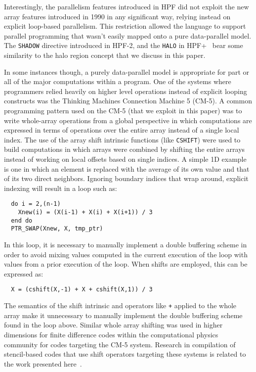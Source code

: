 Interestingly, the parallelism features introduced in HPF did not
exploit the new array features introduced in 1990 in any significant
way, relying instead on explicit loop-based parallelism.  This
restriction allowed the language to support parallel programming that
wasn't easily mapped onto a pure data-parallel model.  The {\tt SHADOW}
directive introduced in HPF-2, and the {\tt HALO} in HPF+~\cite{benkner99hpf}
bear some similarity to the halo region concept that we discuss in this 
paper.

In some instances though, a purely data-parallel model is appropriate
for part or all of the major computations within a program.  One of
the systems where programmers relied heavily on higher level
operations instead of explicit looping constructs was the Thinking
Machines Connection Machine 5 (CM-5).  A common programming pattern
used on the CM-5 (that we exploit in this paper) was to write
whole-array operations from a global perspective in which computations
are expressed in terms of operations over the entire array instead of
a single local index.  The use of the array shift intrinsic functions
(like {\tt CSHIFT}) were used to build computations in which arrays
were combined by shifting the entire arrays instead of working on
local offsets based on single indices.  A simple 1D example is one in
which an element is replaced with the average of its own value and
that of its two direct neighbors.  Ignoring boundary indices that wrap
around, explicit indexing will result in a loop such as:

{\small
\begin{verbatim}
  do i = 2,(n-1)
    Xnew(i) = (X(i-1) + X(i) + X(i+1)) / 3
  end do
  PTR_SWAP(Xnew, X, tmp_ptr)
\end{verbatim}
}

\noindent In this loop, it is necessary to manually implement a double buffering scheme
in order to avoid mixing values computed in the current execution of the loop with values from a 
prior execution of the loop. When shifts are employed, this can be expressed as:

{\small
\begin{verbatim}
  X = (cshift(X,-1) + X + cshift(X,1)) / 3
\end{verbatim}
}

\noindent
The semantics of the shift intrinsic and operators like {\tt +} applied to the whole array make it
unnecessary to manually implement the double buffering scheme found in the loop above.
Similar whole array shifting was used in higher dimensions for finite difference
codes within the computational physics community for codes targeting the CM-5
system.  Research in compilation of stencil-based codes that use shift operators
targeting these systems is related to the work presented
here~\cite{stencil-compiler}.

